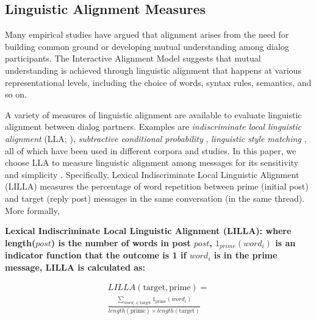 
\subsection{Linguistic Alignment Measures}

Many empirical studies have argued that alignment arises from the need for building common ground  \parencite{clark1991grounding} or developing mutual understanding \parencite{reitter2007predicting} among dialog participants. The Interactive Alignment Model \parencite{pickering2004interactive} suggests that mutual understanding is achieved through linguistic alignment that happens at various representational levels, including the choice of words, syntax rules, semantics, and so on.

A variety of measures of linguistic alignment are available to evaluate linguistic alignment between dialog partners.  Examples are \emph{indiscriminate local linguistic alignment} (LLA; \cite{fusaroli2012coming}), \emph{subtractive conditional probability} \parencite{danescu2011mark}, \emph{linguistic style matching} \parencite{niederhoffer2002linguistic}, all of which have been used in different corpora and studies. In this paper, we choose LLA to measure linguistic alignment among messages for its sensitivity and simplicity \parencite{xu_evaluation_2015}. Specifically, Lexical Indiscriminate Local Linguistic Alignment (LILLA) measures the percentage of word repetition between prime (initial post) and target (reply post) messages in the same conversation (in the same thread). More formally,

\begin{defn} \textbf{Lexical Indiscriminate Local Linguistic Alignment (LILLA): where length($post$) is the number of words in post $post$, $1_{prime}(word_{i})$ is an indicator function that the outcome is 1 if $word_{i}$ is in the prime message, LILLA is calculated as:} \end{defn}

\begin{equation}
\begin{split}
{LILLA}(\text{target},\text{prime})=\\
\frac{\sum_{word_{i}\in \text{target}} 1_{\text{prime}}(word_{i})}{length(\text{prime}) \times length(\text{target})}
\end{split}
\label{eq:LILLA}
\end{equation}

